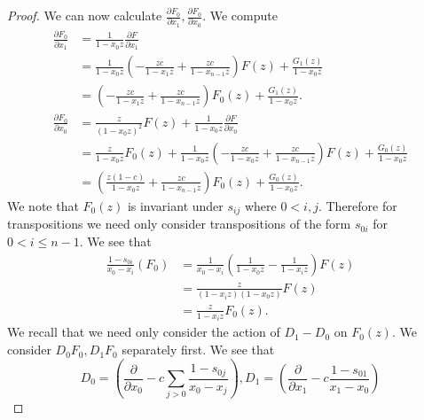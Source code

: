 \documentclass{amsart}
\numberwithin{equation}{section}
\theoremstyle{definition}
\begin{document}
\begin{proof}
We can now calculate $\frac{\partial F_0}{\partial x_1},\frac{\partial F_0}{\partial x_0}$. We compute
\begin{align*}
\frac{\partial F_0}{\partial x_1}%
&=\frac{1}{1-x_0z}\frac{\partial F}{\partial x_1}\\
&=\frac{1}{1-x_0z}\left(-\frac{zc}{1-x_1z}+\frac{zc}{1-x_{n-1}z}\right)F(z)+\frac{G_1(z)}{1-x_0z}\\
&=\left(-\frac{zc}{1-x_1z}+\frac{zc}{1-x_{n-1}z}\right)F_0(z)+\frac{G_1(z)}{1-x_0z}.\\
\frac{\partial F_0}{\partial x_0}%
&=\frac{z}{(1-x_0z)^2}F(z)+\frac{1}{1-x_0z}\frac{\partial F}{\partial x_0}\\
&=\frac{z}{1-x_0z}F_0(z)+\frac{1}{1-x_0z}\left(-\frac{zc}{1-x_0z}+\frac{zc}{1-x_{n-1}z}\right)F(z)+\frac{G_0(z)}{1-x_0z}\\
&=\left(\frac{z(1-c)}{1-x_0z}+\frac{zc}{1-x_{n-1}z}\right)F_0(z)+\frac{G_0(z)}{1-x_0z}.
\end{align*}
We note that $F_0(z)$ is invariant under $s_{ij}$ where $0 < i,j$. Therefore for transpositions we need only consider transpositions of the form $s_{0i}$ for $0 < i \le n-1$. We see that 
\begin{align*}
\frac{1-s_{0i}}{x_0-x_i}(F_0)%
&=\frac{1}{x_0-x_i}\left(\frac{1}{1-x_0z}-\frac{1}{1-x_iz}\right)F(z)\\
&=\frac{z}{(1-x_iz)(1-x_0z)}F(z)\\
&=\frac{z}{1-x_iz}F_0(z).
\end{align*}
We recall that we need only consider the action of $D_1-D_0$ on $F_0(z)$. We consider $D_0F_0, D_1F_0$ separately first. We see that 
\[
D_0=\left(\frac{\partial}{\partial x_0}-c\sum_{j > 0} \frac{1-s_{0j}}{x_0-x_j}\right), D_1=\left(\frac{\partial}{\partial x_1}-c \frac{1-s_{01}}{x_1-x_0}\right)
\]
\end{proof}
\end{document}
